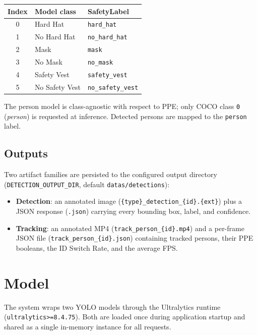 \documentclass[11pt,a4paper]{article}
\begin{document}
\begin{center}
\begin{tabular}{cll}
\toprule
\textbf{Index} & \textbf{Model class} & \textbf{SafetyLabel} \\
\midrule
0 & Hard Hat       & \verb|hard_hat| \\
1 & No Hard Hat    & \verb|no_hard_hat| \\
2 & Mask           & \verb|mask| \\
3 & No Mask        & \verb|no_mask| \\
4 & Safety Vest    & \verb|safety_vest| \\
5 & No Safety Vest & \verb|no_safety_vest| \\
\bottomrule
\end{tabular}
\end{center}

\noindent
The person model is class-agnostic with respect to PPE; only COCO class
\verb|0| (\emph{person}) is requested at inference. Detected persons are mapped
to the \verb|person| label.

\subsection{Outputs}
Two artifact families are persisted to the configured output directory
(\verb|DETECTION_OUTPUT_DIR|, default \verb|datas/detections|):
\begin{itemize}
  \item \textbf{Detection}: an annotated image
        (\verb|{type}_detection_{id}.{ext}|) plus a JSON response
        (\verb|.json|) carrying every bounding box, label, and confidence.
  \item \textbf{Tracking}: an annotated MP4 (\verb|track_person_{id}.mp4|) and a
        per-frame JSON file (\verb|track_person_{id}.json|) containing tracked
        persons, their PPE booleans, the ID Switch Rate, and the average FPS.
\end{itemize}

\section{Model}

The system wraps two YOLO models through the Ultralytics runtime
(\verb|ultralytics>=8.4.75|). Both are loaded once during application startup
and shared as a single in-memory instance for all requests.
\end{document}
